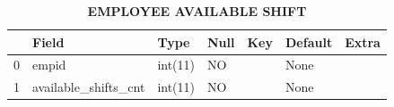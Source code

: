 \documentclass{article} %
\begin{document}
\begin{table}[H]
	\centering
	\caption{\textbf{EMPLOYEE AVAILABLE SHIFT}}
\begin{tabular}{|p{2cm}|p{2cm}|p{2cm}|p{2cm}|p{2cm}|p{2cm}|p{2cm}|}
	\hline
	\toprule
	{} &                 Field &     Type & Null & Key & Default & Extra \\
	\hline
	\midrule
	0 &                 empid &  int(11) &   NO &     &    None &       \\
	1 &  available\_shifts\_cnt &  int(11) &   NO &     &    None &       \\
	\hline
	\bottomrule
\end{tabular}
\end{table}
\end{document}
